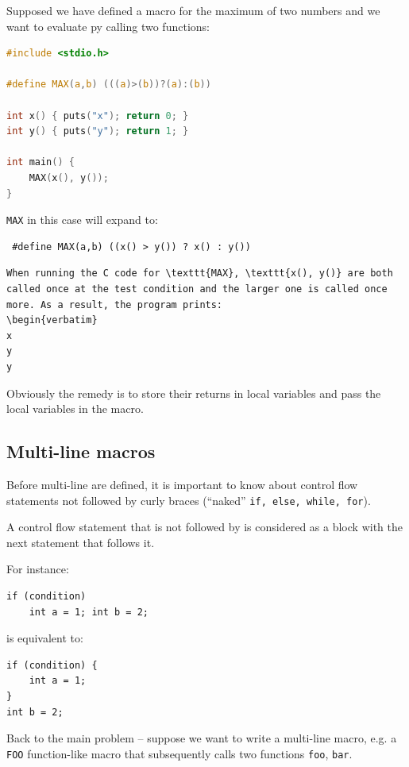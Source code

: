 Supposed we have defined a macro for the maximum of two numbers and we want to evaluate py calling two functions:

\begin{lstlisting}[language=c]
#include <stdio.h>

#define MAX(a,b) (((a)>(b))?(a):(b))

int x() { puts("x"); return 0; }
int y() { puts("y"); return 1; }

int main() {
    MAX(x(), y());
}
\end{lstlisting}
\texttt{MAX} in this case will expand to:
\begin{verbatim}
 #define MAX(a,b) ((x() > y()) ? x() : y())   
\end{verbatim}
\begin{verbatim}
When running the C code for \texttt{MAX}, \texttt{x(), y()} are both called once at the test condition and the larger one is called once more. As a result, the program prints:
\begin{verbatim}
x
y
y
\end{verbatim}
Obviously the remedy is to store their returns in local variables and pass the local variables in the macro.

\subsection{Multi-line macros}

Before multi-line are defined, it is important to know about control flow statements not followed by curly braces (``naked'' \texttt{if, else, while, for}).

\begin{takeaway}
A control flow statement that is not followed by {} is considered as a block with the next statement that follows it.
\end{takeaway}

For instance:
\begin{verbatim}
if (condition)
	int a = 1; int b = 2;    
\end{verbatim}
is equivalent to:
\begin{verbatim}
if (condition) {
	int a = 1;
}
int b = 2;    
\end{verbatim}

Back to the main problem -- suppose we want to write a multi-line macro, e.g. a \texttt{FOO} function-like macro that subsequently calls two functions \texttt{foo}, \texttt{bar}. 

